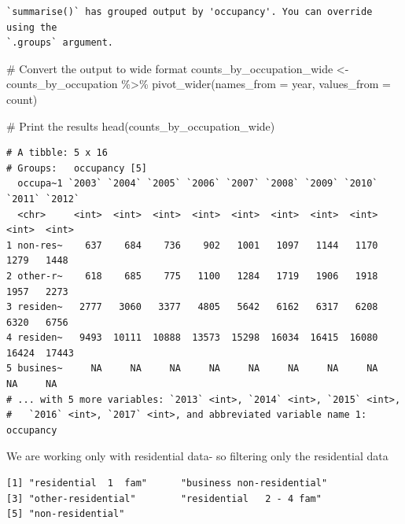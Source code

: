 \documentclass[
  letterpaper,
  DIV=11,
  numbers=noendperiod]{scrartcl}
\newenvironment{Shaded}{\begin{snugshade}}{\end{snugshade}}
\newcommand{\AttributeTok}[1]{\textcolor[rgb]{0.40,0.45,0.13}{#1}}
\newcommand{\CommentTok}[1]{\textcolor[rgb]{0.37,0.37,0.37}{#1}}
\newcommand{\DocumentationTok}[1]{\textcolor[rgb]{0.37,0.37,0.37}{\textit{#1}}}
\newcommand{\FunctionTok}[1]{\textcolor[rgb]{0.28,0.35,0.67}{#1}}
\newcommand{\NormalTok}[1]{\textcolor[rgb]{0.00,0.23,0.31}{#1}}
\newcommand{\OtherTok}[1]{\textcolor[rgb]{0.00,0.23,0.31}{#1}}
\newcommand{\SpecialCharTok}[1]{\textcolor[rgb]{0.37,0.37,0.37}{#1}}
\begin{document}
\begin{verbatim}
`summarise()` has grouped output by 'occupancy'. You can override using the
`.groups` argument.
\end{verbatim}

\begin{Shaded}
\begin{Highlighting}[]
\CommentTok{\# Convert the output to wide format}
\NormalTok{counts\_by\_occupation\_wide }\OtherTok{\textless{}{-}}\NormalTok{ counts\_by\_occupation }\SpecialCharTok{\%\textgreater{}\%}
  \FunctionTok{pivot\_wider}\NormalTok{(}\AttributeTok{names\_from =}\NormalTok{ year, }\AttributeTok{values\_from =}\NormalTok{ count)}
 

\CommentTok{\# Print the results}
\FunctionTok{head}\NormalTok{(counts\_by\_occupation\_wide)}
\end{Highlighting}
\end{Shaded}

\begin{verbatim}
# A tibble: 5 x 16
# Groups:   occupancy [5]
  occupa~1 `2003` `2004` `2005` `2006` `2007` `2008` `2009` `2010` `2011` `2012`
  <chr>     <int>  <int>  <int>  <int>  <int>  <int>  <int>  <int>  <int>  <int>
1 non-res~    637    684    736    902   1001   1097   1144   1170   1279   1448
2 other-r~    618    685    775   1100   1284   1719   1906   1918   1957   2273
3 residen~   2777   3060   3377   4805   5642   6162   6317   6208   6320   6756
4 residen~   9493  10111  10888  13573  15298  16034  16415  16080  16424  17443
5 busines~     NA     NA     NA     NA     NA     NA     NA     NA     NA     NA
# ... with 5 more variables: `2013` <int>, `2014` <int>, `2015` <int>,
#   `2016` <int>, `2017` <int>, and abbreviated variable name 1: occupancy
\end{verbatim}

We are working only with residential data- so filtering only the
residential data

\begin{Shaded}
\end{Shaded}

\begin{verbatim}
[1] "residential  1  fam"      "business non-residential"
[3] "other-residential"        "residential   2 - 4 fam" 
[5] "non-residential"         
\end{verbatim}
\end{document}
